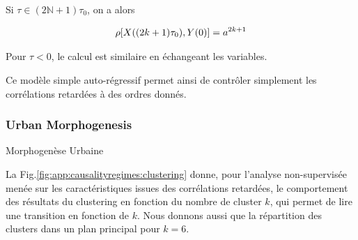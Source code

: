 Si $\tau \in (2 \mathbb{N} + 1) \tau_0$, on a alors

\[
\rho\!\left[X((2k+1)\tau_0),Y(0)\right] = a^{2k+1}
\]

Pour $\tau < 0 $, le calcul est similaire en échangeant les variables.


Ce modèle simple auto-régressif permet ainsi de contrôler simplement les corrélations retardées à des ordres donnés.




\subsubsection{Urban Morphogenesis}{Morphogenèse Urbaine}


La Fig.\ref{fig:app:causalityregimes:clustering} donne, pour l'analyse non-supervisée menée sur les caractéristiques issues des corrélations retardées, le comportement des résultats du clustering en fonction du nombre de cluster $k$, qui permet de lire une transition en fonction de $k$. Nous donnons aussi que la répartition des clusters dans un plan principal pour $k=6$.

